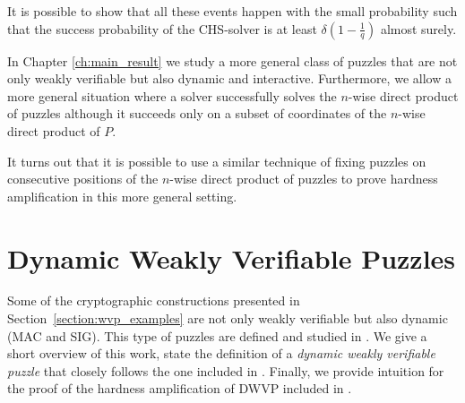 It is possible to show that all these events happen with the small probability such that
the success probability of the CHS-solver is at least $\delta(1\!-\!\frac{1}{q})$ almost surely.

In Chapter \ref{ch:main_result} we study a more general class of puzzles that are not only weakly verifiable but also dynamic and interactive.
Furthermore, we allow a more general situation where a solver successfully solves the $n$-wise direct product of puzzles
although it succeeds only on a subset of coordinates of the $n$-wise direct product of $P$.

It turns out that it is possible to use a similar technique of fixing puzzles on consecutive positions of the $n$-wise direct product of
puzzles to prove hardness amplification in this more general setting.
%
\section{Dynamic Weakly Verifiable Puzzles}
\label{section:dijk}
Some of the cryptographic constructions presented in Section~\ref{section:wvp_examples}
are not only weakly verifiable but also dynamic (MAC and SIG). This type of puzzles are defined and studied in \cite{Dodis:2009:SAI:1530441.1530450}.
We give a short overview of this work, state the definition of a \textit{dynamic weakly verifiable puzzle} that closely follows
the one included in \cite{Dodis:2009:SAI:1530441.1530450}. Finally, we provide intuition for the proof of the hardness amplification of DWVP
included in \cite{Dodis:2009:SAI:1530441.1530450}.

